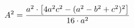 \documentclass[preview]{standalone}
\begin{document}
\begin{align*}
\special{dvisvgm:raw <g id='unique000'>}A^2 = \frac{a^2 \cdot \left[4a^2c^2-(a^2-b^2+c^2)^2\right]}{16 \cdot a^2}\special{dvisvgm:raw </g>}
\end{align*}
\end{document}
